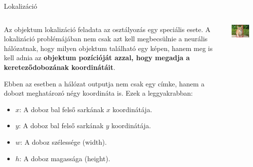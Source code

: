 \documentclass[english, aspectratio=169]{beamer}
\begin{document}
	\begin{frame}{Lokalizáció}
		\begin{columns}
			\begin{column}{.7\textwidth}
				Az objektum lokalizáció feladata az osztályozás egy speciális esete. A lokalizáció problémájában nem csak azt kell megbecsülnie a neurális hálózatnak, hogy milyen objektum található egy képen, hanem meg is kell adnia az \textbf{objektum pozícióját azzal, hogy megadja a kereteződobozának koordinátáit}.\par\smallskip
				Ebben az esetben a hálózat outputja nem csak egy címke, hanem a dobozt meghatározó négy koordináta is. Ezek a leggyakrabban:
				\begin{itemize}
					\item $x$: A doboz bal felső sarkának $x$ koordinátája.
					\item $y$: A doboz bal felső sarkának $y$ koordinátája.
					\item $w$: A doboz szélessége (width).
					\item $h$: A doboz magassága (height).
				\end{itemize}
			\end{column}
			\begin{column}{.3\textwidth}
				\begin{center}
					\includegraphics[width=4cm, keepaspectratio]{images/od_2.png}
				\end{center}
			\end{column}
		\end{columns}
	\end{frame}
	
\end{document}
